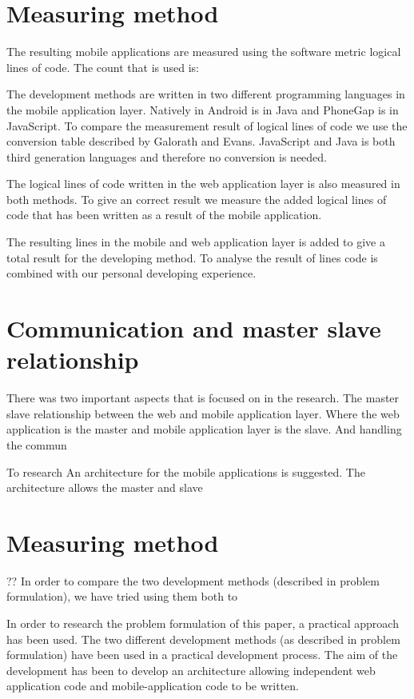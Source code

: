 \section{Measuring method}
The resulting mobile applications are measured using the software metric logical lines of code. The count that is used is:

The development methods are written in two different programming languages in the mobile application layer. Natively in Android is in Java and PhoneGap is in JavaScript. To compare the measurement result of logical lines of code we use the conversion table described by Galorath and Evans\cite[p.~163]{galorath2006}. JavaScript and Java is both third generation languages and therefore no conversion is needed. 

The logical lines of code written in the web application layer is also measured in both methods. To give an correct result we measure the added logical lines of code that has been written as a result of the mobile application. 

The resulting lines in the mobile and web application layer is added to give a total result for the developing method. To analyse the result of lines code is combined with our personal developing experience. 

\section{Communication and master slave relationship}
There was two important aspects that is focused on in the research. The master slave relationship between the web and mobile application layer. Where the web application is the master and mobile application layer is the slave. And handling the commun

To research 
An architecture for the mobile applications is suggested. The architecture allows the master and slave 


\section{Measuring method}
??
In order to compare the two development methods (described in problem formulation), we have tried using them both to 

In order to research the problem formulation of this paper, a practical approach has been used. The two different development methods (as described in problem formulation) have been used in a practical development process. The aim of the development has been to develop an architecture allowing independent web application code and mobile-application code to be written.

